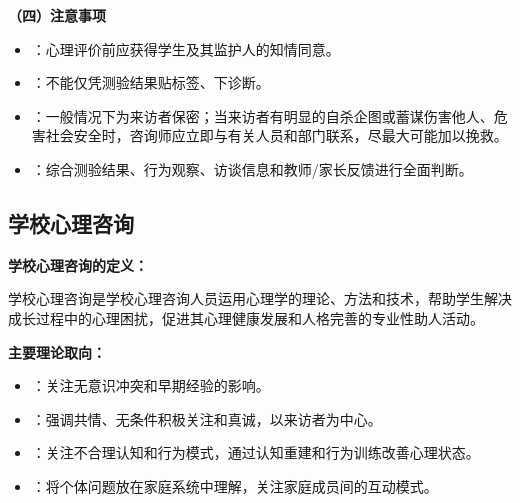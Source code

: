 \begin{keybox}
\textbf{（四）注意事项}

\begin{itemize}[leftmargin=*]
    \item {}：心理评价前应获得学生及其监护人的知情同意。
    \item {}：不能仅凭测验结果贴标签、下诊断。
    \item {}：一般情况下为来访者保密；当来访者有明显的自杀企图或蓄谋伤害他人、危害社会安全时，咨询师应立即与有关人员和部门联系，尽最大可能加以挽救。
    \item {}：综合测验结果、行为观察、访谈信息和教师/家长反馈进行全面判断。
\end{itemize}
\end{keybox}

\subsection{学校心理咨询}

\begin{defbox}
\textbf{学校心理咨询的定义：}

学校心理咨询是学校心理咨询人员运用心理学的理论、方法和技术，帮助学生解决成长过程中的心理困扰，促进其心理健康发展和人格完善的专业性助人活动。

\textbf{主要理论取向：}

\begin{itemize}[leftmargin=*]
    \item {}：关注无意识冲突和早期经验的影响。
    \item {}：强调共情、无条件积极关注和真诚，以来访者为中心。
    \item {}：关注不合理认知和行为模式，通过认知重建和行为训练改善心理状态。
    \item {}：将个体问题放在家庭系统中理解，关注家庭成员间的互动模式。
\end{itemize}
\end{defbox}

